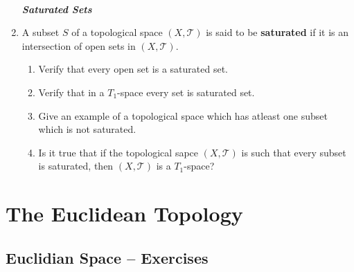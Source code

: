 \documentclass[10pt,a4paper]{report}
\newcommand{\SPECIAL}[1]{\begin{center}
	{\Large \textbf{\textit{\\#1}} }
\end{center}
}
\newcommand{\TT}{\mathcal{T}}
\begin{document}
\begin{enumerate}
\SPECIAL{Saturated Sets}

\item A subset $S$ of a topological space $(X,\TT)$ is said to be \textbf{saturated} if it is an intersection of open sets in $(X, \TT)$.
\begin{enumerate}[label=(\roman*)]
	\item Verify that every open set is a saturated set.
	\item Verify that in a $T_1$-space every set is saturated set.
	\item Give an example of a topological space which has atleast one subset which is not saturated.
	\item Is it true that if the topological sapce $(X, \TT)$ is such that every subset is saturated, then $(X,\TT)$ is a $T_1$-space?
\end{enumerate}
\end{enumerate} %

\chapter{The Euclidean Topology}
\section{Euclidian Space -- Exercises}
\end{document}
